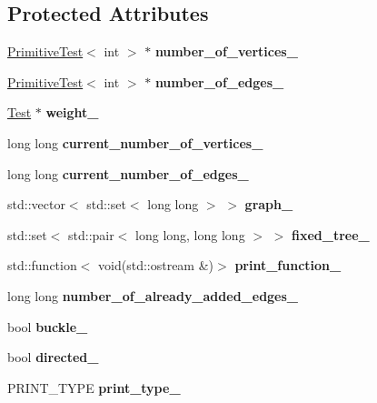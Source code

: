 \subsection*{Protected Attributes}
\begin{DoxyCompactItemize}
\item 
\mbox{\label{class_graph_a79f294fa2b32c3eace0c83bad42c49b4}} 
\hyperlink{class_primitive_test}{Primitive\+Test}$<$ int $>$ $\ast$ {\bfseries number\+\_\+of\+\_\+vertices\+\_\+}
\item 
\mbox{\label{class_graph_a6e6ae1654756cd35ee5fed179bf06818}} 
\hyperlink{class_primitive_test}{Primitive\+Test}$<$ int $>$ $\ast$ {\bfseries number\+\_\+of\+\_\+edges\+\_\+}
\item 
\mbox{\label{class_graph_a01b91e0ef1a5d84cdd6bf6d7ca9108dd}} 
\hyperlink{class_test}{Test} $\ast$ {\bfseries weight\+\_\+}
\item 
\mbox{\label{class_graph_acbda2d069e4637414d8fc310ef1ec50a}} 
long long {\bfseries current\+\_\+number\+\_\+of\+\_\+vertices\+\_\+}
\item 
\mbox{\label{class_graph_aefdca59f340c64399b1f25ae0c69fb2a}} 
long long {\bfseries current\+\_\+number\+\_\+of\+\_\+edges\+\_\+}
\item 
\mbox{\label{class_graph_a352ee3d2c70d89c593ac82aebb16cdc3}} 
std\+::vector$<$ std\+::set$<$ long long $>$ $>$ {\bfseries graph\+\_\+}
\item 
\mbox{\label{class_graph_afc0b5d718159d7d95e38187924c8a302}} 
std\+::set$<$ std\+::pair$<$ long long, long long $>$ $>$ {\bfseries fixed\+\_\+tree\+\_\+}
\item 
\mbox{\label{class_graph_a733469321c21618c5b57dd1363f1b443}} 
std\+::function$<$ void(std\+::ostream \&)$>$ {\bfseries print\+\_\+function\+\_\+}
\item 
\mbox{\label{class_graph_a91c7f8a9e836b4f9c64def9583f27f07}} 
long long {\bfseries number\+\_\+of\+\_\+already\+\_\+added\+\_\+edges\+\_\+}
\item 
\mbox{\label{class_graph_a46abe9c833fc7054773ee12f9e2b1d76}} 
bool {\bfseries buckle\+\_\+}
\item 
\mbox{\label{class_graph_a6cea481b4ca3dc8e8e23fabb30b1506f}} 
bool {\bfseries directed\+\_\+}
\item 
\mbox{\label{class_graph_a68f23124b6972bf5cccbd25fc47013fd}} 
P\+R\+I\+N\+T\+\_\+\+T\+Y\+PE {\bfseries print\+\_\+type\+\_\+}
\end{DoxyCompactItemize}


